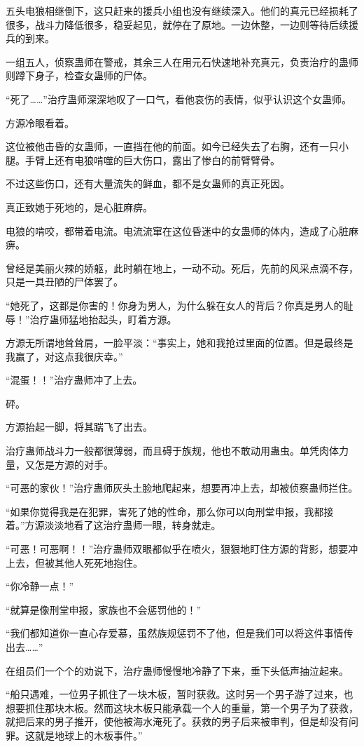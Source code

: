 \begin{this_body}
五头电狼相继倒下，这只赶来的援兵小组也没有继续深入。他们的真元已经损耗了很多，战斗力降低很多，稳妥起见，就停在了原地。一边休整，一边则等待后续援兵的到来。

一组五人，侦察蛊师在警戒，其余三人在用元石快速地补充真元，负责治疗的蛊师则蹲下身子，检查女蛊师的尸体。

“死了……”治疗蛊师深深地叹了一口气，看他哀伤的表情，似乎认识这个女蛊师。

方源冷眼看着。

这位被他击昏的女蛊师，一直挡在他的前面。如今已经失去了右胸，还有一只小腿。手臂上还有电狼啃噬的巨大伤口，露出了惨白的前臂臂骨。

不过这些伤口，还有大量流失的鲜血，都不是女蛊师的真正死因。

真正致她于死地的，是心脏麻痹。

电狼的啃咬，都带着电流。电流流窜在这位昏迷中的女蛊师的体内，造成了心脏麻痹。

曾经是美丽火辣的娇躯，此时躺在地上，一动不动。死后，先前的风采点滴不存，只是一具丑陋的尸体罢了。

“她死了，这都是你害的！你身为男人，为什么躲在女人的背后？你真是男人的耻辱！”治疗蛊师猛地抬起头，盯着方源。

方源无所谓地耸耸肩，一脸平淡：“事实上，她和我抢过里面的位置。但是最终是我赢了，对这点我很庆幸。”

“混蛋！！”治疗蛊师冲了上去。

砰。

方源抬起一脚，将其踹飞了出去。

治疗蛊师战斗力一般都很薄弱，而且碍于族规，他也不敢动用蛊虫。单凭肉体力量，又怎是方源的对手。

“可恶的家伙！”治疗蛊师灰头土脸地爬起来，想要再冲上去，却被侦察蛊师拦住。

“如果你觉得我是在犯罪，害死了她的性命，那么你可以向刑堂申报，我都接着。”方源淡淡地看了这治疗蛊师一眼，转身就走。

“可恶！可恶啊！！”治疗蛊师双眼都似乎在喷火，狠狠地盯住方源的背影，想要冲上去，但被其他人死死地抱住。

“你冷静一点！”

“就算是像刑堂申报，家族也不会惩罚他的！”

“我们都知道你一直心存爱慕，虽然族规惩罚不了他，但是我们可以将这件事情传出去……”

在组员们一个个的劝说下，治疗蛊师慢慢地冷静了下来，垂下头低声抽泣起来。

“船只遇难，一位男子抓住了一块木板，暂时获救。这时另一个男子游了过来，也想要抓住那块木板。然而这块木板只能承载一个人的重量，第一个男子为了获救，就把后来的男子推开，使他被海水淹死了。获救的男子后来被审判，但是却没有问罪。这就是地球上的木板事件。”


\end{this_body}
